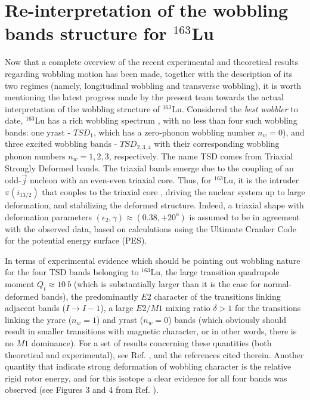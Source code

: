 \documentclass[11pt]{article}
\begin{document}
\section{Re-interpretation of the wobbling bands structure for $^{163}$Lu}

Now that a complete overview of the recent experimental and theoretical results regarding wobbling motion has been made, together with the description of its two regimes (namely, longitudinal wobbling and transverse wobbling), it is worth mentioning the latest progress made by the present team towards the actual interpretation of the wobbling structure of $^{163}$Lu. Considered the \emph{best wobbler} to date, $^{163}$Lu has a rich wobbling spectrum \cite{odegaard2001evidence,jensen2002evidence}, with no less than four such wobbling bands: one yrast - $TSD_1$, which has a zero-phonon wobbling number $n_w=0$), and three excited wobbling bands - $TSD_{2,3,4}$ with their corresponding wobbling phonon numbers $n_w=1,2,3$, respectively. The name TSD comes from Triaxial Strongly Deformed bands. The triaxial bands emerge due to the coupling of an odd-$\vec{j}$ nucleon with an even-even triaxial core. Thus, for $^{163}$Lu, it is the intruder $\pi(i_{13/2})$ that couples to the triaxial core \cite{odegaard2001evidence,hamamoto2002wobbling,jensen2002wobbling}, driving the nuclear system up to large deformation, and stabilizing the deformed structure. Indeed, a triaxial shape with deformation parameters $(\epsilon_2,\gamma)\approx(0.38,+20^\text{o})$ is assumed to be in agreement with the observed data, based on calculations using the Ultimate Cranker Code \cite{bengtsson1990high} for the potential energy surface (PES).

In terms of experimental evidence which should be pointing out wobbling nature for the four TSD bands belonging to $^{163}$Lu, the large transition quadrupole moment $Q_t \approx 10\ b$ \cite{gorgen2004quadrupole} (which is substantially larger than it is the case for normal-deformed bands), the predominantly $E2$ character of the transitions linking adjacent bands ($I\to I-1$), a large $E2/M1$ mixing ratio $\delta>1$ for the transitions linking the yrare ($n_w=1$) and yrast ($n_w=0$) bands (which obviously should result in smaller transitions with magnetic character, or in other words, there is no $M1$ dominance). For a set of results concerning these quantities (both theoretical and experimental), see Ref. \cite{raduta2017semiclassical}, and the references cited therein. Another quantity that indicate strong deformation of wobbling character is the relative rigid rotor energy, and for this isotope a clear evidence for all four bands was observed (see Figures 3 and 4 from Ref. \cite{hagemann2005triaxiality}).
\end{document}
